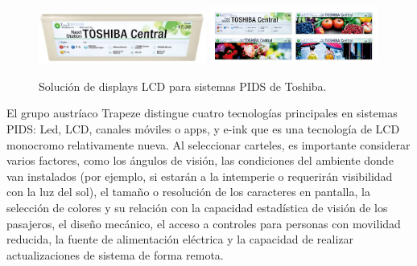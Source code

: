 \begin{figure}[h]
	\centering
	\includegraphics[width=0.49\textwidth]{./Figures/ToshibaPIDS.jpg}
	\includegraphics[width=0.49\textwidth]{./Figures/ToshibaDisplayColorOpciones.jpg}
	\caption{Solución de displays LCD para sistemas PIDS de Toshiba.\protect\footnotemark}
	\label{fig:Toshiba}
\end{figure}



El grupo austríaco Trapeze \citep{Trapeze} distingue cuatro tecnologías principales en sistemas PIDS: Led, LCD, canales móviles o apps, y e-ink que es una tecnología de LCD monocromo relativamente nueva. Al seleccionar carteles, es importante considerar varios factores, como los ángulos de visión, las condiciones del ambiente donde van instalados (por ejemplo, si estarán a la intemperie o requerirán visibilidad con la luz del sol), el tamaño o resolución de los caracteres en pantalla, la selección de colores y su relación con la capacidad estadística de visión de los pasajeros, el diseño mecánico, el acceso a controles para personas con movilidad reducida, la fuente de alimentación eléctrica y la capacidad de realizar actualizaciones de sistema de forma remota. \\ 


